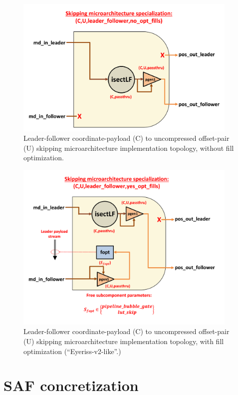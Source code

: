 \begin{figure}[H]
    \centering
    \includegraphics[width=0.95\textwidth]{figures/SKIP_C_U_leader_follower_no_opt_fills.png}
    \caption{Leader-follower coordinate-payload (C) to uncompressed offset-pair (U) skipping microarchitecture implementation topology, without fill optimization.}
    \label{fig:SKIP_C_U_leader_follower_no_opt_fills}
\end{figure}

\begin{figure}[H]
    \centering
    \includegraphics[width=0.95\textwidth]{figures/SKIP_C_U_leader_follower_yes_opt_fills.png}
    \caption{Leader-follower coordinate-payload (C) to uncompressed offset-pair (U) skipping microarchitecture implementation topology, with fill optimization (``Eyeriss-v2-like''\cite{eyerissv2}.)}
    \label{fig:SKIP_C_U_leader_follower_yes_opt_fills}
\end{figure}

\section{SAF concretization}
\label{chapter:saf_concretization}